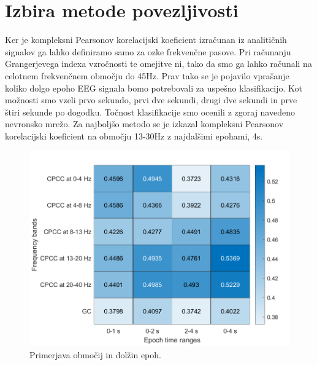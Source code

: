 \section{Izbira metode povezljivosti}
Ker je kompleksni Pearsonov korelacijski koeficient izračunan iz analitičnih signalov ga lahko definiramo samo za ozke frekvenčne pasove. Pri računanju Grangerjevega indexa vzročnosti te omejitve ni, tako da smo ga lahko računali na celotnem frekvenčnem območju do 45Hz. Prav tako se je pojavilo vprašanje koliko dolgo epoho EEG signala bomo potrebovali za uspešno klasifikacijo. Kot možnosti smo vzeli prvo sekundo, prvi dve sekundi, drugi dve sekundi in prve štiri sekunde po dogodku. Točnost klasifikacije smo ocenili z zgoraj navedeno nevronsko mrežo. Za najboljšo metodo se je izkazal kompleksni Pearsonov korelacijski koeficient na območju 13-30Hz z najdalšimi epohami, 4s.
\begin{figure}[h!]
    \begin{center}
    \includegraphics[width=1\linewidth]{slike/Comparison.png}
    \end{center}
    \caption{Primerjava območij in dolžin epoh.}
\end{figure}

\newpage
